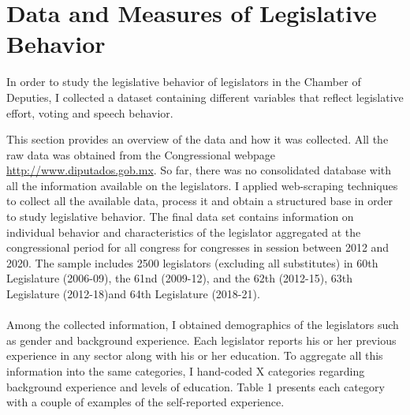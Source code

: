 \documentclass{article}
\begin{document}
	
\section{Data and Measures of Legislative Behavior}

In order to study the legislative behavior of legislators in the Chamber of Deputies, I collected a dataset containing different variables that reflect legislative effort, voting and speech behavior. 

This section provides an overview of the data and how it was collected. All the raw data was obtained from the Congressional webpage \url{http://www.diputados.gob.mx}. So far, there was no consolidated  database with all the information available on the legislators. I applied web-scraping techniques to collect all the available data,  process it and obtain a structured base in order to study legislative behavior. The final data set contains  information on individual behavior and characteristics of the legislator aggregated at the congressional period for all congress for congresses in session between 2012 and 2020. The sample includes 2500 legislators (excluding all substitutes) in 60th Legislature (2006-09), the 61nd (2009-12), and the 62th (2012-15), 63th Legislature (2012-18)and 64th Legislature (2018-21). \\
\\
Among the collected information, I obtained demographics of the legislators such as gender and background experience. Each legislator reports his or her previous experience in any sector along with his or her education. To aggregate all this information into the same categories, I hand-coded X categories regarding background experience and levels of education. Table 1 presents each category with a couple of examples of the self-reported experience. 
\end{document}
